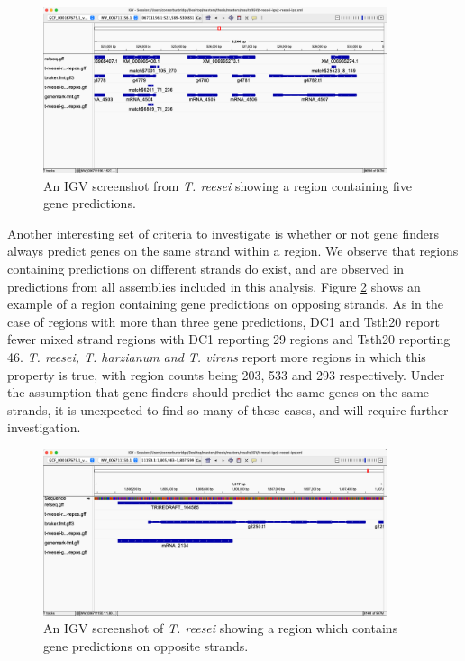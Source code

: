 \begin{figure}
  \centering
  \includegraphics[width=0.9\textwidth]{figures/igv/igv-uncertain-regions.png}
  \caption[Example of a region with many gene calls]{An IGV screenshot
    from \textit{T. reesei} showing a region containing five
    gene predictions.}
  \label{fig:uncertain-regions}
\end{figure}

Another interesting set of criteria to investigate is whether or not
gene finders always predict genes on the same strand within a
region. We observe that regions containing predictions on different
strands do exist, and are observed in predictions from all assemblies
included in this analysis. Figure \ref{fig:opposing-strands} shows an
example of a region containing gene predictions on opposing
strands. As in the case of regions with more than three gene
predictions, DC1 and Tsth20 report fewer mixed strand regions with DC1
reporting 29 regions and Tsth20 reporting 46. \textit{T. reesei,
  T. harzianum and T. virens} report more regions in which this
property is true, with region counts being 203, 533 and 293
respectively. Under the assumption that gene finders should predict
the same genes on the same strands, it is unexpected to find so many
of these cases, and will require further investigation.

\begin{figure}
  \centering
  \includegraphics[width=0.9\textwidth]{figures/igv/igv-opposing-strands.png}
  \caption[Predictions on opposing strands]{An IGV screenshot of
    \textit{T. reesei} showing a region which contains gene
    predictions on opposite strands.}
  \label{fig:opposing-strands}
\end{figure}


